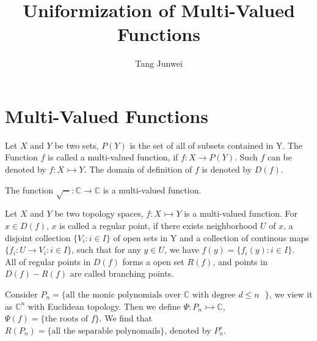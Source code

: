 \documentclass[12pt]{article}
\newcommand{\C}{\mathbb{C}}
\newenvironment{definition}[2][Definition]{\begin{trivlist}
\item[\hskip \labelsep {\bfseries #1}\hskip \labelsep {\bfseries #2.}]}{\end{trivlist}}
\newenvironment{example}[2][Example]{\begin{trivlist}
\item[\hskip \labelsep {\bfseries #1}\hskip \labelsep {\bfseries #2.}]}{\end{trivlist}}
\begin{document}
\newenvironment{rmk}[2][Remark]{\begin{trivlist}
\item[\hskip \labelsep {\bfseries #1}\hskip \labelsep {\bfseries #2.}]}{\end{trivlist}}
 
\title{Uniformization of Multi-Valued Functions}%
\author{Tang Junwei} %
 
\maketitle
\tableofcontents
\newpage
\section{Multi-Valued Functions}
\begin{definition}{1.1}
    Let $X$ and $Y$ be two sets, $P(Y)$ is the set of all of subsets contained in Y. The Function $f$ is called a multi-valued function, if $f: X\to P(Y)$. Such $f$ can be denoted by $f:X\rightarrowtail Y$. The domain of definition of $f$ is denoted by $D(f)$.
\end{definition}
\begin{example}{1.2}
    The function $\sqrt{-}:\C\to\C$ is a multi-valued function.
\end{example}
\begin{definition}{1.3}
    Let $X$ and $Y$ be two topology spaces, $f:X\rightarrowtail Y$ is a multi-valued function. For $x\in D(f)$, $x$ is called a regular point, if there exists neighborhood $U$ of $x$, a disjoint collection $\{V_i:i\in I\}$ of open sets in Y and a collection of continous maps $\{f_i:U\to V_i:i\in I\}$, such that for any $y\in U$, we have $f(y)=\{f_i(y):i\in I\}$.\\
    
    All of regular points in $D(f)$ forms a open set $R(f)$, and points in $D(f)- R(f)$ are called branching points.
\end{definition}
\begin{example}{1.4}
    Consider $P_n=\{\text{all the monic polynomials over $\mathbb{C}$ with degree $d\leq n$ }\}$, we view it as $\C^n$ with Euclidean topology. Then we define $\Psi:P_n\rightarrowtail\C$, $\Psi(f)=\{\text{the roots of $f$}\}$. We find that $R(P_n)=\{\text{all the separable polynomails}\}$, denoted by $P_n^s$.
\end{example}
\end{document}
